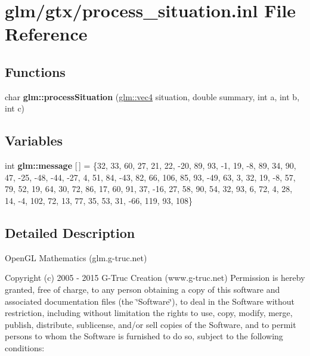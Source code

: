 \hypertarget{process__situation_8inl}{\section{glm/gtx/process\-\_\-situation.inl File Reference}
\label{process__situation_8inl}
}
\subsection*{Functions}
\begin{DoxyCompactItemize}
\item 
char {\bfseries glm\-::process\-Situation} (\hyperlink{group__core__types_ga5881b1b022d7fd1b7218f5916532dd02}{glm\-::vec4} situation, double summary, int a, int b, int c)
\end{DoxyCompactItemize}
\subsection*{Variables}
\begin{DoxyCompactItemize}
\item 
\hypertarget{namespaceglm_aefbcb63d6367009d787d3779827d21e2}{int {\bfseries glm\-::message} \mbox{[}$\,$\mbox{]} = \{32, 33, 60, 27, 21, 22, -\/20, 89, 93, -\/1, 19, -\/8, 89, 34, 90, 47, -\/25, -\/48, -\/44, -\/27, 4, 51, 84, -\/43, 82, 66, 106, 85, 93, -\/49, 63, 3, 32, 19, -\/8, 57, 79, 52, 19, 64, 30, 72, 86, 17, 60, 91, 37, -\/16, 27, 58, 90, 54, 32, 93, 6, 72, 4, 28, 14, -\/4, 102, 72, 13, 77, 35, 53, 31, -\/66, 119, 93, 108\}}\label{namespaceglm_aefbcb63d6367009d787d3779827d21e2}

\end{DoxyCompactItemize}


\subsection{Detailed Description}
Open\-G\-L Mathematics (glm.\-g-\/truc.\-net)

Copyright (c) 2005 -\/ 2015 G-\/\-Truc Creation (www.\-g-\/truc.\-net) Permission is hereby granted, free of charge, to any person obtaining a copy of this software and associated documentation files (the \char`\"{}\-Software\char`\"{}), to deal in the Software without restriction, including without limitation the rights to use, copy, modify, merge, publish, distribute, sublicense, and/or sell copies of the Software, and to permit persons to whom the Software is furnished to do so, subject to the following conditions\-:

